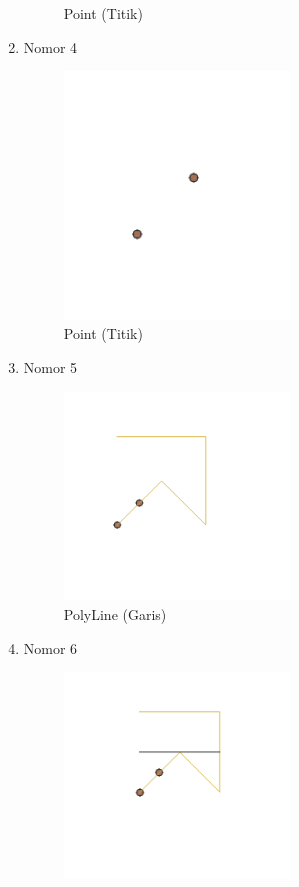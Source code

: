 \begin{enumerate}
\begin{figure}[H]
		\centering
		\caption{Point (Titik)}
	\end{figure}
	\item Nomor 4
	
	\begin{figure}[H]
		\includegraphics[width=6cm]{figures/Tugas2/1174089/4.PNG}
		\centering
		\caption{Point (Titik)}
	\end{figure}
	\item Nomor 5
	
	\begin{figure}[H]
		\includegraphics[width=6cm]{figures/Tugas2/1174089/5.PNG}
		\centering
		\caption{PolyLine (Garis)}
	\end{figure}
	\item Nomor 6
	
	\begin{figure}[H]
		\includegraphics[width=6cm]{figures/Tugas2/1174089/6.PNG}

\end{figure}
\end{enumerate}
